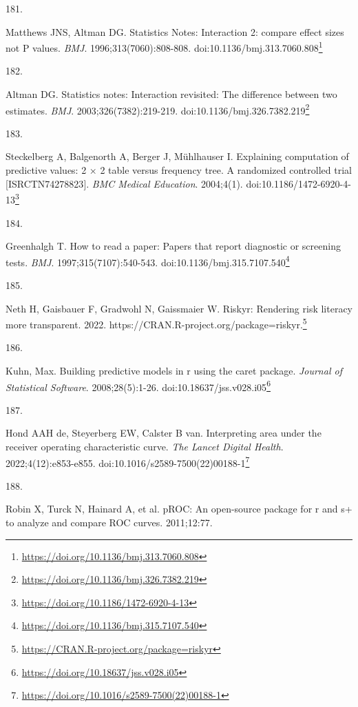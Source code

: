 \documentclass[
  a4paper,
]{book}
\newlength{\cslhangindent}
\newlength{\csllabelwidth}
\newlength{\cslentryspacingunit} %
\newenvironment{CSLReferences}[2] %
 {%
  \setlength{\parindent}{0pt}
  \ifodd #1
  \let\oldpar\par
  \def\par{\hangindent=\cslhangindent\oldpar}
  \fi
  \setlength{\parskip}{#2\cslentryspacingunit}
 }%
 {}
\newcommand{\CSLLeftMargin}[1]{\parbox[t]{\csllabelwidth}{#1}}
\newcommand{\CSLRightInline}[1]{\parbox[t]{\linewidth - \csllabelwidth}{#1}\break}
\renewcommand{\href}[2]{#2\footnote{\url{#1}}}
\begin{document}
\begin{CSLReferences}{0}{0}
\leavevmode{}%
\CSLLeftMargin{181. }%
\CSLRightInline{Matthews JNS, Altman DG. Statistics Notes: Interaction 2: compare effect sizes not P values. \emph{BMJ}. 1996;313(7060):808-808. doi:\href{https://doi.org/10.1136/bmj.313.7060.808}{10.1136/bmj.313.7060.808}}

\leavevmode{}%
\CSLLeftMargin{182. }%
\CSLRightInline{Altman DG. Statistics notes: Interaction revisited: The difference between two estimates. \emph{BMJ}. 2003;326(7382):219-219. doi:\href{https://doi.org/10.1136/bmj.326.7382.219}{10.1136/bmj.326.7382.219}}

\leavevmode{}%
\CSLLeftMargin{183. }%
\CSLRightInline{Steckelberg A, Balgenorth A, Berger J, Mühlhauser I. Explaining computation of predictive values: 2 × 2 table versus frequency tree. A randomized controlled trial {[}ISRCTN74278823{]}. \emph{BMC Medical Education}. 2004;4(1). doi:\href{https://doi.org/10.1186/1472-6920-4-13}{10.1186/1472-6920-4-13}}

\leavevmode{}%
\CSLLeftMargin{184. }%
\CSLRightInline{Greenhalgh T. How to read a paper: Papers that report diagnostic or screening tests. \emph{BMJ}. 1997;315(7107):540-543. doi:\href{https://doi.org/10.1136/bmj.315.7107.540}{10.1136/bmj.315.7107.540}}

\leavevmode{}%
\CSLLeftMargin{185. }%
\CSLRightInline{Neth H, Gaisbauer F, Gradwohl N, Gaissmaier W. Riskyr: Rendering risk literacy more transparent. 2022. \href{https://CRAN.R-project.org/package=riskyr}{https://CRAN.R-project.org/package=riskyr.}}

\leavevmode{}%
\CSLLeftMargin{186. }%
\CSLRightInline{Kuhn, Max. Building predictive models in r using the caret package. \emph{Journal of Statistical Software}. 2008;28(5):1-26. doi:\href{https://doi.org/10.18637/jss.v028.i05}{10.18637/jss.v028.i05}}

\leavevmode{}%
\CSLLeftMargin{187. }%
\CSLRightInline{Hond AAH de, Steyerberg EW, Calster B van. Interpreting area under the receiver operating characteristic curve. \emph{The Lancet Digital Health}. 2022;4(12):e853-e855. doi:\href{https://doi.org/10.1016/s2589-7500(22)00188-1}{10.1016/s2589-7500(22)00188-1}}

\leavevmode{}%
\CSLLeftMargin{188. }%
\CSLRightInline{Robin X, Turck N, Hainard A, et al. pROC: An open-source package for r and s+ to analyze and compare ROC curves. 2011;12:77.}


\end{CSLReferences}
\end{document}
